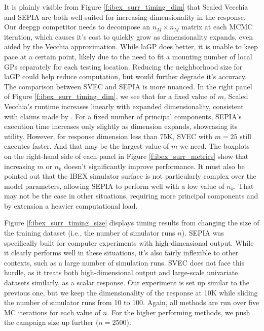 \documentclass[11pt]{article}
\begin{document}
It is plainly visible from Figure \ref{f:ibex_surr_timing_dim} that Scaled
Vecchia and SEPIA are both well-suited for increasing dimensionality in the
response. Our {\sf deepgp} competitor needs to decompose an $n_M \times n_M$
matrix at each MCMC iteration, which causes it's cost to quickly grow as
dimensionality expands, even aided by the Vecchia approximation. While {\sf
laGP} does better, it is unable to keep pace at a certain point, likely due to
the need to fit a mounting number of local GPs separately for each testing
location. Reducing the neighborhood size for {\sf laGP} could help reduce
computation, but would further degrade it's accuracy. The comparison between
{\color{red}SVEC} and SEPIA is more nuanced. In the right panel of Figure
\ref{f:ibex_surr_timing_dim}, we see that for a fixed value of $m$, Scaled
Vecchia's runtime increases linearly with expanded dimensionality,
consistent with claims made by \citet{katzfuss2021general}. For a fixed number
of principal components, SEPIA's execution time increases only slightly as
dimension expands, showcasing its utility. However, for response dimension
less than 75K, SVEC with $m=25$ still executes faster. And that may
be the largest value of $m$ we need. The boxplots on the right-hand side of
each panel in Figure \ref{f:ibex_surr_metrics} show that increasing $m$ or
$n_k$ doesn't significantly improve performance. It must also be pointed out
that the IBEX simulator surface is not particularly complex over the model
parameters, allowing SEPIA to perform well with a low value of $n_k$. That may
not be the case in other situations, requiring more principal components and by
extension a heavier computational load.

Figure \ref{f:ibex_surr_timing_size} displays timing results from changing the
size of the training dataset (i.e., the number of simulator runs $n$). SEPIA was
specifically built for computer experiments with high-dimensional output. While
it clearly performs well in these situations, it's also fairly inflexible to
other contexts, such as a large number of simulation runs. {\color{red}SVEC} does
not face this hurdle, as it treats both high-dimensional output and large-scale
univariate datasets similarly, as a scalar response. Our experiment is set up
similar to the previous one, but we keep the dimensionality of the response at
10K while sliding the number of simulator runs from 10 to 100. Again, all
methods are run over five MC iterations for each value of $n$. For the higher
performing methods, we push the campaign size up further ($n=2500$).
\end{document}
